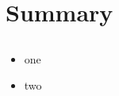 \section{Summary}
\subsection{} %

\begin{frame}{}
  \begin{itemize}\setlength{\itemsep}{3mm}
    \item one
    \item two
  \end{itemize}
\end{frame}
